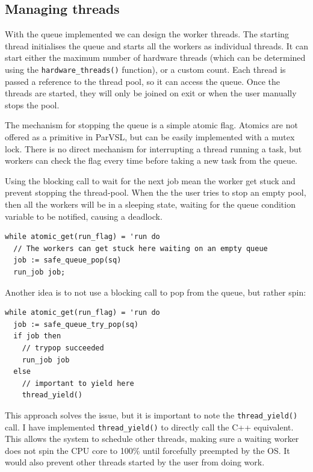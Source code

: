 \subsection{Managing threads}

With the queue implemented we can design the worker threads. The starting thread
initialises the queue and starts all the workers as individual threads. It can start
either the maximum number of hardware threads (which can be determined using the
\texttt{hardware\_threads()} function), or a custom count. Each thread is passed a reference to
the thread pool, so it can access the queue. Once the threads are started, they will only
be joined on exit or when the user manually stops the pool.

The mechanism for stopping the queue is a simple atomic flag. Atomics are not offered as
a primitive in ParVSL, but can be easily implemented with a mutex lock. There is no direct
mechanism for interrupting a thread running a task, but workers can check the flag every time
before taking a new task from the queue.

Using the blocking call to wait for the next job mean the worker get stuck and prevent
stopping the thread-pool. When the the user tries to stop an empty pool, then all
the workers will be in a sleeping state, waiting for the queue condition variable to be
notified, causing a deadlock.

\begin{verbatim}
while atomic_get(run_flag) = 'run do
  // The workers can get stuck here waiting on an empty queue
  job := safe_queue_pop(sq)
  run_job job;
\end{verbatim}

Another idea is to not use a blocking call to pop from the queue, but rather spin:
\begin{verbatim}
while atomic_get(run_flag) = 'run do
  job := safe_queue_try_pop(sq)
  if job then
    // trypop succeeded
    run_job job
  else
    // important to yield here
    thread_yield()
\end{verbatim}

This approach solves the issue, but it is important to note the \texttt{thread\_yield()} call.
I have implemented \texttt{thread\_yield()} to directly call the C++ equivalent. This allows the
system to schedule other threads, making sure a waiting worker does not spin the CPU
core to 100\% until forcefully preempted by the OS. It would also prevent other threads
started by the user from doing work.

